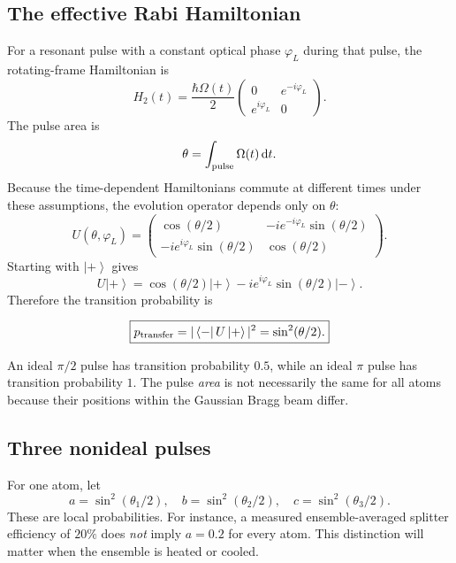 \documentclass[11pt,a4paper]{article}
\numberwithin{equation}{section}
\newcommand{\dd}{\mathrm{d}}
\newcommand{\ket}[1]{\left|#1\right\rangle}
\newcommand{\bra}[1]{\left\langle #1\right|}
\begin{document}
\subsection{The effective Rabi Hamiltonian}

For a resonant pulse with a constant optical phase $\varphi_L$ during that
pulse, the rotating-frame Hamiltonian is
\begin{equation}
H_2(t)=\frac{\hbar\Omega(t)}2
\begin{pmatrix}0&e^{-i\varphi_L}\\e^{i\varphi_L}&0\end{pmatrix}.
\end{equation}
The pulse area is
\begin{equation}\label{eq:pulsearea}
\theta=\int_{\rm pulse}\Omega(t)\,\dd t.
\end{equation}
Because the time-dependent Hamiltonians commute at different times under
these assumptions, the evolution operator depends only on $\theta$:
\begin{equation}
U(\theta,\varphi_L)=
\begin{pmatrix}
 \cos(\theta/2)&-i e^{-i\varphi_L}\sin(\theta/2)\\
 -i e^{i\varphi_L}\sin(\theta/2)&\cos(\theta/2)
\end{pmatrix}.
\end{equation}
Starting with $\ket{+}$ gives
\begin{equation}
U\ket{+}=\cos(\theta/2)\ket{+}
 -i e^{i\varphi_L}\sin(\theta/2)\ket{-}.
\end{equation}
Therefore the transition probability is
\begin{keybox}
\begin{equation}\label{eq:rabi}
\boxed{p_{\rm transfer}=|\bra{-}U\ket{+}|^2=\sin^2(\theta/2).}
\end{equation}
\end{keybox}
An ideal $\pi/2$ pulse has transition probability $0.5$, while an ideal
$\pi$ pulse has transition probability $1$. The pulse \emph{area} is not
necessarily the same for all atoms because their positions within the
Gaussian Bragg beam differ.

\subsection{Three nonideal pulses}

For one atom, let
\begin{equation}\label{eq:abc}
\boxed{a=\sin^2(\theta_1/2),\quad
b=\sin^2(\theta_2/2),\quad
c=\sin^2(\theta_3/2).}
\end{equation}
These are local probabilities. For instance, a measured ensemble-averaged
splitter efficiency of $20\%$ does \emph{not} imply $a=0.2$ for every atom.
This distinction will matter when the ensemble is heated or cooled.
\end{document}
